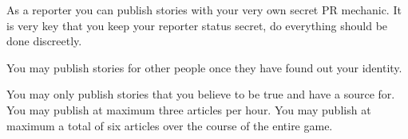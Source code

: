 \documentclass[green]{LRSguildcamp1}
\begin{document}
\name{\gNewspaperPR{}}

As a reporter you can publish stories with your very own secret PR mechanic. It is very key that you keep your reporter status secret, do everything should be done discreetly. 

You may publish stories for other people once they have found out your identity. 

You may only publish stories that you believe to be true and have a source for. You may publish at maximum three articles per hour. You may publish at maximum a total of six articles  over the course of the entire game. 






\end{document}
